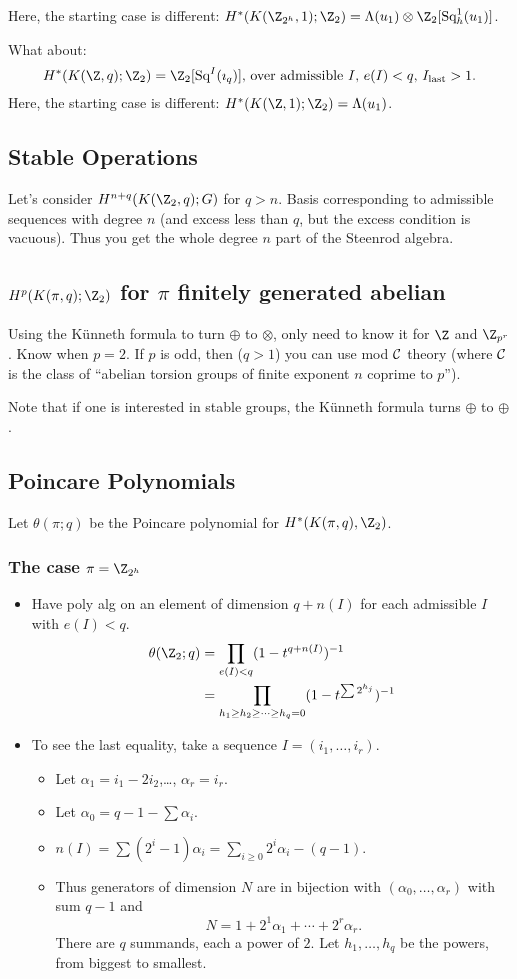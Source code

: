 \documentclass[11pt]{article}
\begin{document}
\begin{SerreCohModTwoEilMacLane}
\begin{itemise}
Here, the starting case is different: $H^*(K(\Z_{2^h},1);\Z_2)=\Lambda(u_1)\otimes\Z_2[\Squ_h^1(u_1)]$.
\item What about:
\[\text{$H^*(K(\Z,q);\Z_2)=\Z_2[\Squ^I(\imath_q)]$, over admissible $I$, $e(I)<q$, $I_\text{last}>1$.}\]
Here, the starting case is different: $H^*(K(\Z,1);\Z_2)=\Lambda(u_1)$.
\end{itemise}
\subsection*{Stable Operations}
Let's consider $H^{n+q}(K(\Z_2,q);G)$ for $q>n$. Basis corresponding to admissible sequences with degree $n$ (and excess less than $q$, but the excess condition is vacuous). Thus you get the whole degree $n$ part of the Steenrod algebra.
\subsection*{$H^p(K(\pi,q);\Z_2)$ for $\pi$ finitely generated abelian}
Using the K\"unneth formula to turn $\oplus$ to $\otimes$, only need to know it for $\Z$ and $\Z_{p^r}$. Know when $p=2$. If $p$ is odd, then ($q>1$) you can use mod $\mathcal{C}$ theory (where $\mathcal{C}$ is the class of ``abelian torsion groups of finite exponent $n$ coprime to $p$'').

Note that if one is interested in stable groups, the K\"unneth formula turns $\oplus$ to $\oplus$.
\subsection*{Poincare Polynomials}
Let $\theta(\pi;q)$ be the Poincare polynomial for $H^*(K(\pi,q),\Z_2)$.
\subsubsection*{The case $\pi=\Z_{2^h}$}
\begin{itemize}\squishlist
\item Have poly alg on an element of dimension $q+n(I)$ for each admissible $I$ with $e(I)<q$.
\begin{align*}
\theta(\Z_2;q)&=\prod_{e(I)<q}(1-t^{q+n(I)})^{-1}\\
&=\prod_{h_1\geq h_2\geq\cdots\geq h_{q}=0}(1-t^{\sum2^{h_j}})^{-1}
\end{align*}
\item To see the last equality, take a sequence $I=(i_1,\ldots,i_r)$.
\begin{itemize}\squishlist
\item Let $\alpha_1=i_1-2i_2$,\ldots, $\alpha_r=i_r$.
\item Let $\alpha_0=q-1-\sum\alpha_i$.
\item $n(I)=\sum (2^i-1)\alpha_i=\sum_{i\geq0}2^i\alpha_i-(q-1)$.
\item Thus generators of dimension $N$ are in bijection with $(\alpha_0,\ldots,\alpha_r)$ with sum $q-1$ and
\[N=1+2^1\alpha_1+\cdots+2^r\alpha_r.\]
There are $q$ summands, each a power of $2$. Let $h_1,\ldots, h_q$ be the powers, from biggest to smallest.
\end{itemize}
\end{itemize}

\end{SerreCohModTwoEilMacLane}
\end{document}
